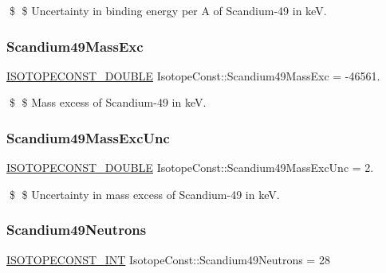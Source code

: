 \$ \$ Uncertainty in binding energy per A of Scandium-\/49 in keV. \mbox{\label{group___isotope_const-_scandium-_sc49_gae6ccacdd45baa4c65ed9e46d486f5321}} 
\subsubsection{\texorpdfstring{Scandium49\+Mass\+Exc}{Scandium49MassExc}}
{\footnotesize\ttfamily \mbox{\hyperlink{group___isotope_const-_macros_ga8f45a7272ce02c0b4c65c44636ed719a}{I\+S\+O\+T\+O\+P\+E\+C\+O\+N\+S\+T\+\_\+\+D\+O\+U\+B\+LE}} Isotope\+Const\+::\+Scandium49\+Mass\+Exc = -\/46561.}

\$ \$ Mass excess of Scandium-\/49 in keV. \mbox{\label{group___isotope_const-_scandium-_sc49_ga74ba4e9d1042eda2f397004f1e16e608}} 
\subsubsection{\texorpdfstring{Scandium49\+Mass\+Exc\+Unc}{Scandium49MassExcUnc}}
{\footnotesize\ttfamily \mbox{\hyperlink{group___isotope_const-_macros_ga8f45a7272ce02c0b4c65c44636ed719a}{I\+S\+O\+T\+O\+P\+E\+C\+O\+N\+S\+T\+\_\+\+D\+O\+U\+B\+LE}} Isotope\+Const\+::\+Scandium49\+Mass\+Exc\+Unc = 2.}

\$ \$ Uncertainty in mass excess of Scandium-\/49 in keV. \mbox{\label{group___isotope_const-_scandium-_sc49_ga91f59d5f836e9386fffe26ec5269d71a}} 
\subsubsection{\texorpdfstring{Scandium49\+Neutrons}{Scandium49Neutrons}}
{\footnotesize\ttfamily \mbox{\hyperlink{group___isotope_const-_macros_ga5f18360b3e99483a35c32d789e62621c}{I\+S\+O\+T\+O\+P\+E\+C\+O\+N\+S\+T\+\_\+\+I\+NT}} Isotope\+Const\+::\+Scandium49\+Neutrons = 28}

